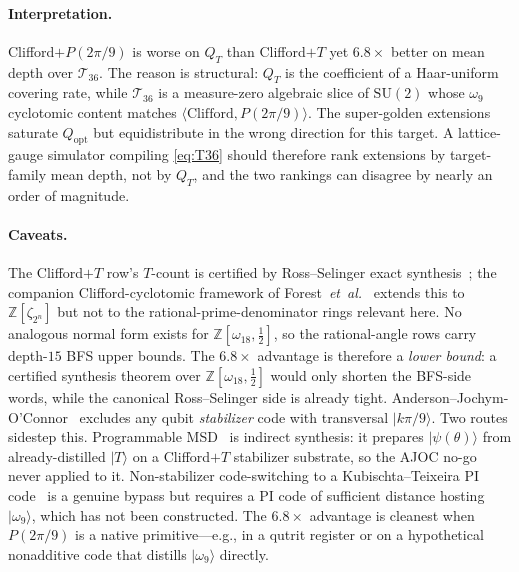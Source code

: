\documentclass[twocolumn,superscriptaddress,showpacs,nofootinbib,notitlepage,preprintnumbers,secnumarabic,amssymb, nobibnotes, aps, prd]{revtex4-2}
\newcommand{\QT}{Q_{T}}              %
\newcommand{\Popt}{Q_{\mathrm{opt}}} %
\begin{document}
\paragraph*{Interpretation.}
Clifford$+P(2\pi/9)$ is worse on $\QT$ than Clifford$+T$ yet $6.8\times$ better on mean depth over $\mathcal{T}_{36}$. The reason is structural: $\QT$ is the coefficient of a Haar-uniform covering rate, while $\mathcal{T}_{36}$ is a measure-zero algebraic slice of $\mathrm{SU}(2)$ whose $\omega_9$ cyclotomic content matches $\langle\mathrm{Clifford}, P(2\pi/9)\rangle$. The super-golden extensions saturate $\Popt$ but equidistribute in the wrong direction for this target. A lattice-gauge simulator compiling \cref{eq:T36} should therefore rank extensions by target-family mean depth, not by $\QT$, and the two rankings can disagree by nearly an order of magnitude.

\paragraph*{Caveats.}
The Clifford$+T$ row's $T$-count is certified by Ross--Selinger exact synthesis~\cite{Ross:2014kbr,Kliuchnikov:2012pla}; the companion Clifford-cyclotomic framework of Forest~\emph{et~al.}~\cite{Forest:2015cc} extends this to $\mathbb{Z}[\zeta_{2^n}]$ but not to the rational-prime-denominator rings relevant here. No analogous normal form exists for $\mathbb{Z}[\omega_{18},\tfrac{1}{2}]$, so the rational-angle rows carry depth-$15$ BFS upper bounds. The $6.8\times$ advantage is therefore a \emph{lower bound}: a certified synthesis theorem over $\mathbb{Z}[\omega_{18},\tfrac{1}{2}]$ would only shorten the BFS-side words, while the canonical Ross--Selinger side is already tight. Anderson--Jochym-O'Connor~\cite{Anderson:2014} excludes any qubit \emph{stabilizer} code with transversal $|k\pi/9\rangle$. Two routes sidestep this. Programmable MSD~\cite{DuclosCianciPoulin:2015,CampbellOGorman:2016,CampbellHoward:2017} is indirect synthesis: it prepares $|\psi(\theta)\rangle$ from already-distilled $|T\rangle$ on a Clifford$+T$ stabilizer substrate, so the AJOC no-go never applied to it. Non-stabilizer code-switching to a Kubischta--Teixeira PI code~\cite{KubischtaTeixeira:2024,OuyangJingBrennen:2024} is a genuine bypass but requires a PI code of sufficient distance hosting $|\omega_9\rangle$, which has not been constructed. The $6.8\times$ advantage is cleanest when $P(2\pi/9)$ is a native primitive---e.g., in a qutrit register or on a hypothetical nonadditive code that distills $|\omega_9\rangle$ directly.
\end{document}

